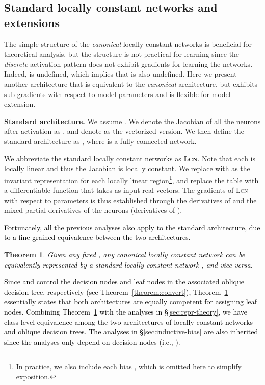 \documentclass{article} \usepackage{iclr2020_conference,times}
\newtheorem{theorem}{Theorem}\newtheorem{definition}[theorem]{Definition}
\newcommand{\textcyan}[1]{\textcolor{black}{#1}}
\newcommand{\xref}[1]{\S\ref{#1}}
\begin{document}
 \vspace{-1mm}
\subsection{Standard locally constant networks and extensions}\label{sec:standard}

The simple structure of the \emph{canonical} locally constant networks is beneficial for theoretical analysis, but the structure is not practical for learning since the \emph{discrete} activation pattern does not exhibit gradients for learning the networks. Indeed,  is undefined, which implies that  is also undefined. Here we present another architecture that is equivalent to the \emph{canonical} architecture, but exhibits sub-gradients with respect to model parameters and is flexible for model extension. 

\textbf{Standard architecture.} 
We assume . We denote the Jacobian of all the neurons after activation  as , and denote  as the vectorized version. We then define the standard architecture as , where  is a fully-connected network.

We abbreviate the standard locally constant networks as \textbf{\textsc{Lcn}}. Note that each  is locally linear and thus the Jacobian  is locally constant.
We replace  with  as the invariant representation for each locally linear region\footnote{In practice, we also include each bias , which is omitted here to simplify exposition.},
and replace the table  with a differentiable function  that takes as input real vectors. The gradients of \textsc{Lcn} with respect to parameters is thus established through the derivatives of  and the mixed partial derivatives of the neurons (derivatives of ). 


\textcyan{Fortunately, all the previous analyses also apply to the standard architecture, due to a fine-grained equivalence between the two architectures.}
\begin{theorem}
\textcyan{Given any fixed , any canonical locally constant network  can be equivalently represented by a standard locally constant network , and vice versa.}
\label{thm:architecture_equivalence}
\end{theorem}
\textcyan{Since  and  control the decision nodes and leaf nodes in the associated oblique decision tree, respectively (see Theorem~\ref{theorem:convert}), Theorem~\ref{thm:architecture_equivalence} essentially states that both architectures are equally competent for assigning leaf nodes. Combining Theorem~\ref{thm:architecture_equivalence} with the analyses in \xref{sec:repr-theory}, we have class-level equivalence among the two architectures of locally constant networks and oblique decision trees. The analyses in \xref{sec:inductive-bias} are also inherited since the analyses only depend on decision nodes (i.e., ).}
\end{document}
